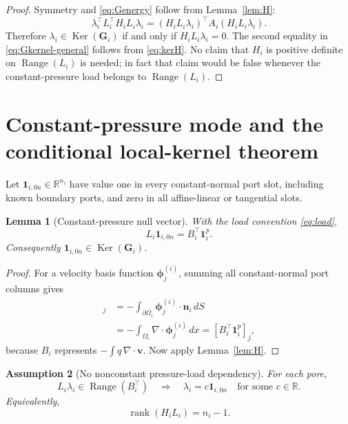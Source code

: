 \documentclass[11pt,a4paper]{article}
\newtheorem{assumption}{Assumption}[section]
\newtheorem{lemma}[assumption]{Lemma}
\newcommand{\R}{\mathbb{R}}
\newcommand{\normal}{\bm n}
\newcommand{\DtN}{\mathbf G}
\newcommand{\one}{\bm 1}
\newcommand{\Range}{\operatorname{Range}}
\newcommand{\Ker}{\operatorname{Ker}}
\newcommand{\rank}{\operatorname{rank}}
\begin{document}
\begin{proof}
Symmetry and \eqref{eq:Genergy} follow from Lemma~\ref{lem:H}:
\[
 \lambda_i^\top L_i^\top H_iL_i\lambda_i
 =(H_iL_i\lambda_i)^\top A_i(H_iL_i\lambda_i).
\]
Therefore $\lambda_i\in\Ker(\DtN_i)$ if and only if
$H_iL_i\lambda_i=0$.  The second equality in
\eqref{eq:Gkernel-general} follows from \eqref{eq:kerH}.
No claim that $H_i$ is positive definite on $\Range(L_i)$ is needed; in fact
that claim would be false whenever the constant-pressure load belongs to
$\Range(L_i)$.
\end{proof}

\section{Constant-pressure mode and the conditional local-kernel theorem}

Let $\one_{i,0n}\in\R^{n_i}$ have value one in every constant-normal port
slot, including known boundary ports, and zero in all affine-linear or
tangential slots.

\begin{lemma}[Constant-pressure null vector]\label{lem:constant}
With the load convention \eqref{eq:load},
\begin{equation}\label{eq:constant-load}
 L_i\one_{i,0n}=B_i^\top\mathbf 1_i^p.
\end{equation}
Consequently $\one_{i,0n}\in\Ker(\DtN_i)$.
\end{lemma}

\begin{proof}
For a velocity basis function $\bm\phi_j^{(i)}$, summing all constant-normal
port columns gives
\begin{align*}
 [L_i\one_{i,0n}]_j
 &=-\int_{\partial\Omega_i}\bm\phi_j^{(i)}\cdot\normal_i\,dS\\
 &=-\int_{\Omega_i}\nabla\cdot\bm\phi_j^{(i)}\,dx
 =[B_i^\top\mathbf 1_i^p]_j,
\end{align*}
because $B_i$ represents $-\int q\,\nabla\cdot\bm v$.  Now apply
Lemma~\ref{lem:H}.
\end{proof}

\begin{assumption}[No nonconstant pressure-load dependency]
\label{ass:kernel}
For each pore,
\begin{equation}\label{eq:kernel-assumption}
 L_i\lambda_i\in\Range(B_i^\top)
 \quad\Longrightarrow\quad
 \lambda_i=c\one_{i,0n}\quad\text{for some }c\in\R.
\end{equation}
Equivalently,
\begin{equation}\label{eq:rank}
 \rank(H_iL_i)=n_i-1.
\end{equation}
\end{assumption}
\end{document}
